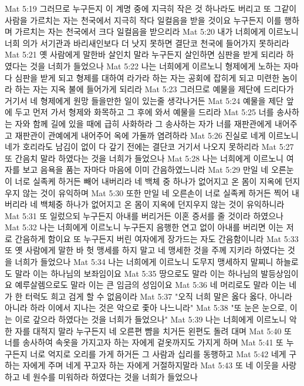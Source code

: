 Mat 5:19  그러므로 누구든지 이 계명 중에 지극히 작은 것 하나라도 버리고 또 그같이 사람을 가르치는 자는 천국에서 지극히 작다 일컬음을 받을 것이요 누구든지 이를 행하며 가르치는 자는 천국에서 크다 일컬음을 받으리라
Mat 5:20  내가 너희에게 이르노니 너희 의가 서기관과 바리새인보다 더 낫지 못하면 결단코 천국에 들어가지 못하리라
Mat 5:21  옛 사람에게 말한바 살인치 말라 누구든지 살인하면 심판을 받게 되리라 하였다는 것을 너희가 들었으나
Mat 5:22  나는 너희에게 이르노니 형제에게 노하는 자마다 심판을 받게 되고 형제를 대하여 라가라 하는 자는 공회에 잡히게 되고 미련한 놈이라 하는 자는 지옥 불에 들어가게 되리라
Mat 5:23  그러므로 예물을 제단에 드리다가 거기서 네 형제에게 원망 들을만한 일이 있는줄 생각나거든
Mat 5:24  예물을 제단 앞에 두고 먼저 가서 형제와 화목하고 그 후에 와서 예물을 드리라
Mat 5:25  너를 송사하는 자와 함께 길에 있을 때에 급히 사화하라 그 송사하는 자가 너를 재판관에게 내어주고 재판관이 관예에게 내어주어 옥에 가둘까 염려하라
Mat 5:26  진실로 네게 이르노니 네가 호리라도 남김이 없이 다 갚기 전에는 결단코 거기서 나오지 못하리라
Mat 5:27  또 간음치 말라 하였다는 것을 너희가 들었으나
Mat 5:28  나는 너희에게 이르노니 여자를 보고 음욕을 품는 자마다 마음에 이미 간음하였느니라
Mat 5:29  만일 네 오른눈이 너로 실족케 하거든 빼어 내버리라 네 백체 중 하나가 없어지고 온 몸이 지옥에 던지우지 않는 것이 유익하며
Mat 5:30  또한 만일 네 오른손이 너로 실족케 하거든 찍어 내버리라 네 백체중 하나가 없어지고 온 몸이 지옥에 던지우지 않는 것이 유익하니라
Mat 5:31  또 일렀으되 누구든지 아내를 버리거든 이혼 증서를 줄 것이라 하였으나
Mat 5:32  나는 너희에게 이르노니 누구든지 음행한 연고 없이 아내를 버리면 이는 저로 간음하게 함이요 또 누구든지 버린 여자에게 장가드는 자도 간음함이니라
Mat 5:33  또 옛 사람에게 말한 바 헛 맹세를 하지 말고 네 맹세한 것을 주께 지키라 하였다는 것을 너희가 들었으나
Mat 5:34  나는 너희에게 이르노니 도무지 맹세하지 말찌니 하늘로도 말라 이는 하나님의 보좌임이요
Mat 5:35  땅으로도 말라 이는 하나님의 발등상임이요 예루살렘으로도 말라 이는 큰 임금의 성임이요
Mat 5:36  네 머리로도 말라 이는 네가 한 터럭도 희고 검게 할 수 없음이라
Mat 5:37  "오직 너희 말은 옳다 옳다, 아니라 아니라 하라 이에서 지나는 것은 악으로 좇아 나느니라"
Mat 5:38  "또 눈은 눈으로, 이는 이로 갚으라 하였다는 것을 너희가 들었으나"
Mat 5:39  나는 너희에게 이르노니 악한 자를 대적지 말라 누구든지 네 오른편 뺨을 치거든 왼편도 돌려 대며
Mat 5:40  또 너를 송사하여 속옷을 가지고자 하는 자에게 겉옷까지도 가지게 하며
Mat 5:41  또 누구든지 너로 억지로 오리를 가게 하거든 그 사람과 십리를 동행하고
Mat 5:42  네게 구하는 자에게 주며 네게 꾸고자 하는 자에게 거절하지말라
Mat 5:43  또 네 이웃을 사랑하고 네 원수를 미워하라 하였다는 것을 너희가 들었으나
